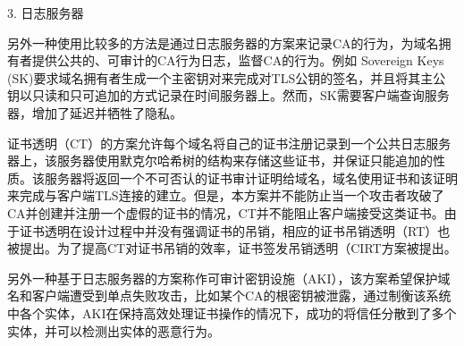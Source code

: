 3. 日志服务器

另外一种使用比较多的方法是通过日志服务器的方案来记录CA的行为，为域名拥有者提供公共的、可审计的CA行为日志，监督CA的行为。例如 Sovereign Keys (SK)\cite{eckersleysovereign}要求域名拥有者生成一个主密钥对来完成对TLS公钥的签名，并且将其主公钥以只读和只可追加的方式记录在时间服务器上。然而，SK需要客户端查询服务器，增加了延迟并牺牲了隐私。

证书透明（CT）\cite{laurie2013certificate}的方案允许每个域名将自己的证书注册记录到一个公共日志服务器上，该服务器使用默克尔哈希树的结构来存储这些证书，并保证只能追加的性质。该服务器将返回一个不可否认的证书审计证明给域名，域名使用证书和该证明来完成与客户端TLS连接的建立。但是，本方案并不能防止当一个攻击者攻破了CA并创建并注册一个虚假的证书的情况，CT并不能阻止客户端接受这类证书。由于证书透明在设计过程中并没有强调证书的吊销，相应的证书吊销透明（RT）\cite{laurie2012revocation}也被提出。为了提高CT对证书吊销的效率，证书签发吊销透明（CIRT\cite{ryan2014enhanced}方案被提出。

另外一种基于日志服务器的方案称作可审计密钥设施（AKI）\cite{kim2013accountable}，该方案希望保护域名和客户端遭受到单点失败攻击，比如某个CA的根密钥被泄露，通过制衡该系统中各个实体，AKI在保持高效处理证书操作的情况下，成功的将信任分散到了多个实体，并可以检测出实体的恶意行为。







